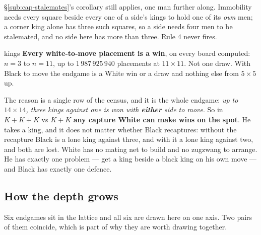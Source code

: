 \documentclass[11pt]{article}
\begin{document}
\S\ref{sub:cap-stalemates}'s corollary still applies, one man further along.
Immobility needs every square beside every one of a side's kings to hold one of
its \emph{own} men; a corner king alone has three such squares, so a side needs
four men to be stalemated, and no side here has more than three. Rule 4 never
fires.

\begin{result}[title={Three kings beat two, and it is not close}]{kings}
\textbf{Every white-to-move placement is a win}, on every board computed:
$n = 3$ to $n = 11$, up to $1\,987\,925\,940$ placements at $11\times11$. Not
one draw. With Black to move the endgame is a White win or a draw and nothing else
from $5\times5$ up.

The reason is a single row of the census, and it is the whole endgame:
\emph{up to $14\times14$, three kings against one is won with \textbf{either}
side to move}. So in $K\!+\!K\!+\!K$ vs $K\!+\!K$ \textbf{any capture White can
make wins on the spot}. He takes a king, and it does not matter whether Black
recaptures: without the recapture Black is a lone king against three, and with
it a lone king against two, and both are lost. White has no mating net to build
and no zugzwang to arrange. He has exactly one problem --- get a king beside a
black king on his own move --- and Black has exactly one defence.
\end{result}

\subsection{How the depth grows}\label{sub:kings-growth}

\noindent
Six endgames sit in the lattice and all six are drawn here on one axis. Two
pairs of them coincide, which is part of why they are worth drawing together.
\end{document}
